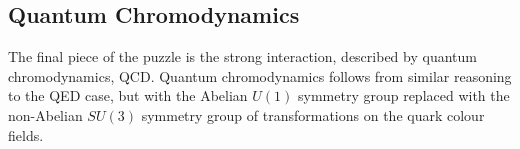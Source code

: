 %
%
%


\subsection{Quantum Chromodynamics}
\label{sec:QCD}
The final piece of the puzzle is the strong interaction, described by quantum
chromodynamics, QCD. 
Quantum chromodynamics follows from similar reasoning to the QED case, but with
the Abelian $U(1)$ symmetry group replaced with the non-Abelian $SU(3)$ symmetry
group of transformations on the quark colour fields.

